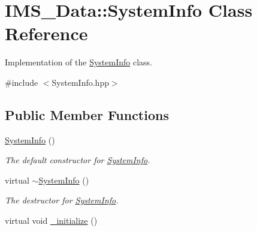 \hypertarget{classIMS__Data_1_1SystemInfo}{
\section{IMS\_\-Data::SystemInfo Class Reference}
\label{classIMS__Data_1_1SystemInfo}
}


Implementation of the \hyperlink{classIMS__Data_1_1SystemInfo}{SystemInfo} class.  




{\ttfamily \#include $<$SystemInfo.hpp$>$}

\subsection*{Public Member Functions}
\begin{DoxyCompactItemize}
\item 
\hypertarget{classIMS__Data_1_1SystemInfo_a9e754d2ffa132b0da388097e308d747c}{
\hyperlink{classIMS__Data_1_1SystemInfo_a9e754d2ffa132b0da388097e308d747c}{SystemInfo} ()}
\label{classIMS__Data_1_1SystemInfo_a9e754d2ffa132b0da388097e308d747c}

\begin{DoxyCompactList}\small\item\em The default constructor for \hyperlink{classIMS__Data_1_1SystemInfo}{SystemInfo}. \item\end{DoxyCompactList}\item 
\hypertarget{classIMS__Data_1_1SystemInfo_abc943e58c597aed20600fdf4a28ab89c}{
virtual \hyperlink{classIMS__Data_1_1SystemInfo_abc943e58c597aed20600fdf4a28ab89c}{$\sim$SystemInfo} ()}
\label{classIMS__Data_1_1SystemInfo_abc943e58c597aed20600fdf4a28ab89c}

\begin{DoxyCompactList}\small\item\em The destructor for \hyperlink{classIMS__Data_1_1SystemInfo}{SystemInfo}. \item\end{DoxyCompactList}\item 
\hypertarget{classIMS__Data_1_1SystemInfo_abad52b92a6d5bb4d9fde9538506fd76f}{
virtual void \hyperlink{classIMS__Data_1_1SystemInfo_abad52b92a6d5bb4d9fde9538506fd76f}{\_\-initialize} ()}
\label{classIMS__Data_1_1SystemInfo_abad52b92a6d5bb4d9fde9538506fd76f}


\end{DoxyCompactItemize}
